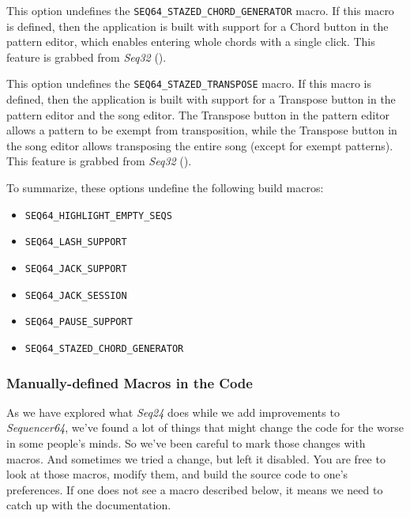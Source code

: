         This option undefines the \texttt{SEQ64\_STAZED\_CHORD\_GENERATOR}
        macro.  If this macro is defined,
        then the application is built with support for a Chord button in the
        pattern editor, which enables entering whole chords with a single
        click.  This feature is grabbed from \textsl{Seq32} (\cite{seq32}).

        This option undefines the \texttt{SEQ64\_STAZED\_TRANSPOSE}
        macro.  If this macro is defined,
        then the application is built with support for a Transpose button in the
        pattern editor and the song editor.  The Transpose button in the
        pattern editor allows a pattern to be exempt from transposition,
        while the Transpose button in the song editor allows transposing the
        entire song (except for exempt patterns).
        This feature is grabbed from \textsl{Seq32} (\cite{seq32}).

    To summarize, these options undefine the following build macros:

      \begin{itemize}
        \item \texttt{SEQ64\_HIGHLIGHT\_EMPTY\_SEQS}
        \item \texttt{SEQ64\_LASH\_SUPPORT}
        \item \texttt{SEQ64\_JACK\_SUPPORT}
        \item \texttt{SEQ64\_JACK\_SESSION}
        \item \texttt{SEQ64\_PAUSE\_SUPPORT}
        \item \texttt{SEQ64\_STAZED\_CHORD\_GENERATOR}
      \end{itemize}

\subsubsection{Manually-defined Macros in the Code}
\label{subsubsec:seq64_build_macros}

   As we have explored what \textsl{Seq24} does while we add improvements to
   \textsl{Sequencer64}, we've found a lot of things that might change the code
   for the worse in some people's minds.  So we've been careful to mark those
   changes with macros.  And sometimes we tried a change, but left it
   disabled.  You are free to look at those macros, modify them, and build
   the source code to one's preferences.  If one does not see a macro described
   below, it means we need to catch up with the documentation.

